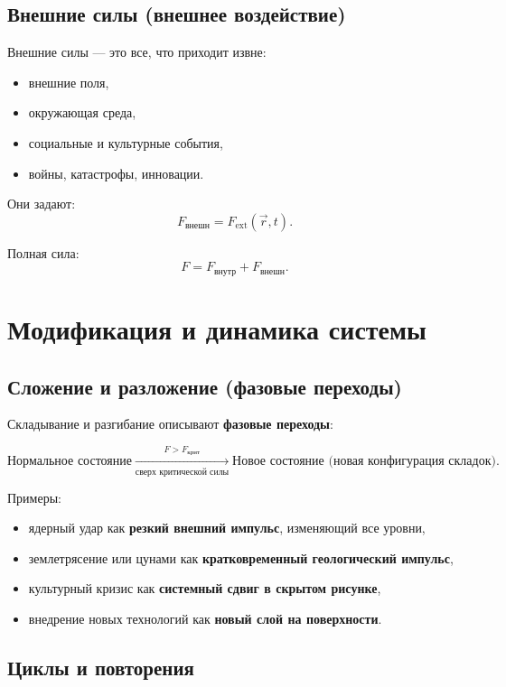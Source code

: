 \documentclass[12pt]{article}
\begin{document}
\subsection{Внешние силы (внешнее воздействие)}

Внешние силы — это все, что приходит извне:

\begin{itemize}
  \item внешние поля,
  \item окружающая среда,
  \item социальные и культурные события,
  \item войны, катастрофы, инновации.
\end{itemize}

Они задают:
\[
 F_{\text{внешн}} = F_{\text{ext}}(\vec{r}, t).
\]

Полная сила:
\[
 F = F_{\text{внутр}} + F_{\text{внешн}}.
\]

\section{Модификация и динамика системы}

\subsection{Сложение и разложение (фазовые переходы)}

Складывание и разгибание описывают \textbf{фазовые переходы}:

\[
 \text{Нормальное состояние} \xrightarrow[\text{сверх критической силы}]{F > F_{\text{крит}}}
 \text{Новое состояние (новая конфигурация складок)}.
\]

Примеры:
\begin{itemize}
  \item ядерный удар как \textbf{резкий внешний импульс}, изменяющий все уровни,
  \item землетрясение или цунами как \textbf{кратковременный геологический импульс},
  \item культурный кризис как \textbf{системный сдвиг в скрытом рисунке},
  \item внедрение новых технологий как \textbf{новый слой на поверхности}.
\end{itemize}

\subsection{Циклы и повторения}
\end{document}
